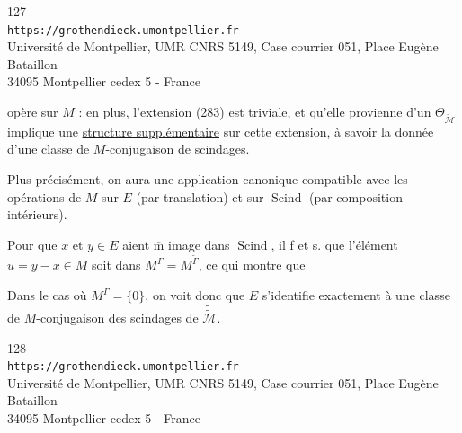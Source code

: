 
\begin{center}
\small
127\\
\texttt{https://grothendieck.umontpellier.fr}\\
Université de Montpellier, UMR CNRS 5149, Case courrier 051, Place Eugène Bataillon\\
34095 Montpellier cedex 5 - France
\end{center}

opère   sur $M$ : en plus, l'extension (283) est triviale, et   qu'elle provienne d'un $\Theta_{\widetilde{\mathcal M}}$ implique une \uline{structure supplémentaire} sur cette extension, à savoir la donnée d'une classe de $M$-conjugaison de scindages.

Plus précisément, on aura une application canonique
compatible avec les opérations de $M$ sur $E$ (par translation) et sur $\operatorname{Scind}$ (par composition   intérieurs).

Pour que $x$ et $y\in E$ aient $\overline{\mathrm m}$ image dans $\operatorname{Scind}$, il f et s. que l'élément $u=y-x\in M$ soit dans $M^\Gamma=M^{\widetilde\Gamma}$, ce qui montre que
\diagram{
\[
\begin{tikzcd}[column sep=large,row sep=large]
\text{l'hom }E \arrow[r,no head] & \operatorname{Scind}\text{ est injectif} \\
& \text{sss}\quad M^\Gamma=\{0\}\quad .
\end{tikzcd}
\tag{286}
\]
}

Dans le cas où $M^\Gamma=\{0\}$, on voit donc que $E$ s'identifie exactement à une classe de $M$-conjugaison des scindages de $\widetilde{\widetilde{\mathcal M}}$.


\begin{center}
\small
128\\
\texttt{https://grothendieck.umontpellier.fr}\\
Université de Montpellier, UMR CNRS 5149, Case courrier 051, Place Eugène Bataillon\\
34095 Montpellier cedex 5 - France
\end{center}

